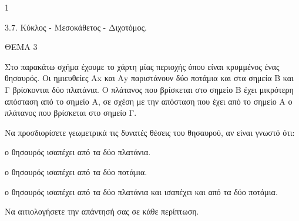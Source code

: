 \begin{ylh}{1}
    \item 3.7. Κύκλος - Μεσοκάθετος - Διχοτόμος.
\end{ylh}

ΘΕΜΑ 3

Στο παρακάτω σχήμα έχουμε το χάρτη μίας περιοχής όπου είναι κρυμμένος ένας θησαυρός. Οι ημιευθείες Αx και Αy παριστάνουν δύο ποτάμια και στα σημεία Β και Γ βρίσκονται δύο πλατάνια. Ο πλάτανος που βρίσκεται στο σημείο Β έχει μικρότερη απόσταση από το σημείο Α, σε σχέση με την απόσταση που έχει από το σημείο Α ο πλάτανος που βρίσκεται στο σημείο Γ.

Να προσδιορίσετε γεωμετρικά τις δυνατές θέσεις του θησαυρού, αν είναι γνωστό ότι:

\begin{alist}
\item ο θησαυρός ισαπέχει από τα δύο πλατάνια. 

\item ο θησαυρός ισαπέχει από τα δύο ποτάμια. 

\item ο θησαυρός ισαπέχει από τα δύο πλατάνια και ισαπέχει και από τα δύο ποτάμια.


Να αιτιολογήσετε την απάντησή σας σε κάθε περίπτωση.


\begin{center}
\end{center}
\end{alist}

